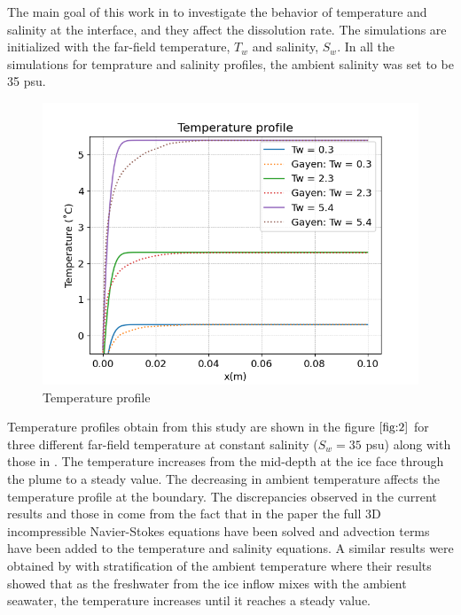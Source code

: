 \documentclass[11pt,a4paper]{article}
\begin{document}
    \bigskip 
    
    The main goal of this work in to investigate the behavior of temperature and salinity at the interface, and they affect the dissolution rate.
    The simulations are initialized with the far-field temperature, $T_w$ and salinity, $S_w$. In all the simulations for temprature and salinity profiles, the ambient salinity was set to be 35 psu.
	
	\begin{figure}[H]
	    
	    \centering 
	    \includegraphics[width=12cm]{tempProfile}
	    \caption{Temperature profile}
	    \label{fig:2}
	\end{figure}
	
	Temperature profiles obtain from this study are shown in the figure $\ref{fig:2}$ for three different far-field temperature at constant salinity ($S_w = 35$ psu) along with those in \citet{gayen2016simulation}. The temperature increases from the mid-depth at the ice face through the plume to a steady value. The decreasing in ambient temperature affects the temperature profile at the boundary. The discrepancies observed in the current results and those in  \cite{gayen2016simulation} come from the fact that in the paper the full 3D incompressible Navier-Stokes equations  have been solved and advection terms have been added to the temperature and salinity equations. A similar results were obtained by \cite{jenkins2011convection} with stratification of the ambient temperature where their results showed that as the freshwater from the ice inflow mixes with the ambient seawater, the temperature increases until it reaches a steady value. 
	
\end{document}
